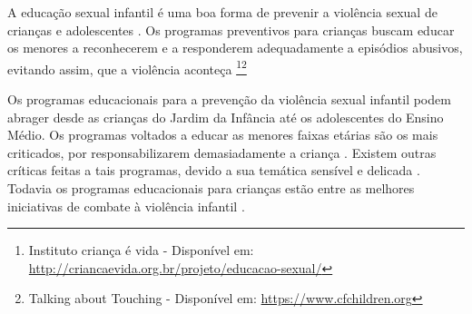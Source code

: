 A educação sexual infantil é uma boa forma de prevenir a violência sexual de crianças e adolescentes \cite{finkelhor2009prevention}. Os programas preventivos para crianças buscam educar os menores a reconhecerem e a responderem adequadamente a episódios abusivos, evitando assim, que a violência aconteça \footnote{Instituto criança é vida - Disponível em: \url{http://criancaevida.org.br/projeto/educacao-sexual/}}\footnote{Talking about Touching - Disponível em: \url{https://www.cfchildren.org}}%

\vspace{-0.15cm}



Os programas educacionais para a prevenção da violência sexual infantil podem abrager desde as crianças do Jardim da Infância até os adolescentes do Ensino Médio. Os programas voltados a educar as menores faixas etárias são os mais criticados, por responsabilizarem demasiadamente a criança \cite{dip2016advancing}. %
Existem outras críticas feitas a tais programas, devido a sua temática sensível e delicada \cite{scholes2014serious}. Todavia os programas educacionais para crianças estão entre as melhores iniciativas de combate à violência infantil \cite{barron2008school}.%
\vspace{-0.15cm}

